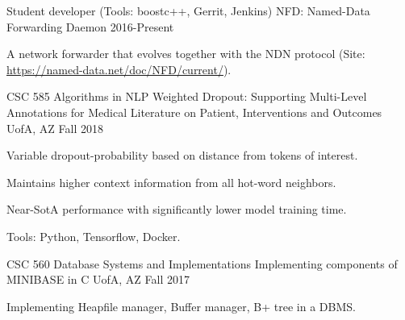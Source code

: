 

\begin{cventries}

\cventry
    {Student developer (Tools: boostc++, Gerrit, Jenkins)} %
    {NFD: Named-Data Forwarding Daemon} %
    {} %
    {2016-Present} %
    {
      \begin{cvitems} %
        \item {A network forwarder that evolves together with the NDN protocol (Site: \url{https://named-data.net/doc/NFD/current/}).}
      \end{cvitems}
    }
    {}

\cventry
    {CSC 585 Algorithms in NLP} %
    {Weighted Dropout: Supporting Multi-Level Annotations for Medical Literature on Patient, Interventions and Outcomes} %
    {UofA, AZ} %
    {Fall 2018} %
    {
      \begin{cvitems} %
        \item {Variable dropout-probability based on distance from tokens of interest.}
        \item {Maintains higher context information from all hot-word neighbors.}
        \item {Near-SotA performance with significantly lower model training time.}
        \item {Tools: Python, Tensorflow, Docker.}
      \end{cvitems}
    }
    {}

  \cventry
    {CSC 560 Database Systems and Implementations} %
    {Implementing components of MINIBASE in C} %
    {UofA, AZ} %
    {Fall 2017} %
    {
      \begin{cvitems} %
        \item {Implementing Heapfile manager, Buffer manager, B+ tree in a DBMS.}
      \end{cvitems}
    }
    {}


\end{cventries}
